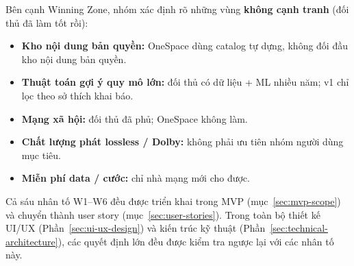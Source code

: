 Bên cạnh Winning Zone, nhóm xác định rõ những vùng \textbf{không cạnh tranh} (đối thủ đã làm tốt rồi):

\begin{itemize}
    \item \textbf{Kho nội dung bản quyền:} OneSpace dùng catalog tự dựng, không đối đầu kho nội dung bản quyền.
    \item \textbf{Thuật toán gợi ý quy mô lớn:} đối thủ có dữ liệu + ML nhiều năm; v1 chỉ lọc theo sở thích khai báo.
    \item \textbf{Mạng xã hội:} đối thủ đã phủ; OneSpace không làm.
    \item \textbf{Chất lượng phát lossless / Dolby:} không phải ưu tiên nhóm người dùng mục tiêu.
    \item \textbf{Miễn phí data / cước:} chỉ nhà mạng mới cho được.
\end{itemize}

Cả sáu nhân tố W1--W6 đều được triển khai trong MVP (mục~\ref{sec:mvp-scope}) và chuyển thành user story (mục~\ref{sec:user-stories}). Trong toàn bộ thiết kế UI/UX (Phần~\ref{sec:ui-ux-design}) và kiến trúc kỹ thuật (Phần~\ref{sec:technical-architecture}), các quyết định lớn đều được kiểm tra ngược lại với các nhân tố này.
